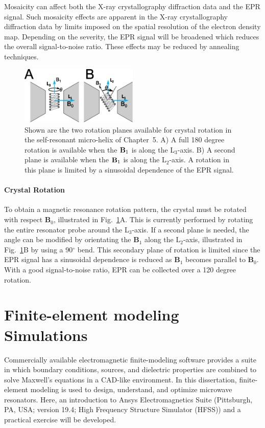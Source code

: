 Mosaicity can affect both the X-ray crystallography diffraction data and the EPR signal. Such mosaicity effects are apparent in the X-ray crystallography diffraction data by limits imposed on the spatial resolution of the electron density map. \cite{blundell1976protein} Depending on the severity, the EPR signal will be broadened which reduces the overall signal-to-noise ratio. These effects may be reduced by annealing techniques. \cite{Kriminskien0056}

\begin{figure}[htb]
 \centering
 \includegraphics[width=0.5\textwidth]{Kapitel/Ch2-Images/RotateMeLeftRight.eps}
 \caption[Rotation Planes of micro-Helix.]{Shown are the two rotation planes available for crystal rotation in the self-resonant micro-helix of Chapter~5. A) A full 180 degree rotation is available when the ${\textbf B}_1$ is along the L$_3$-axis. B) A second plane is available when the ${\textbf B}_1$ is along the L$_2$-axis. A rotation in this plane is limited by a sinusoidal dependence of the EPR signal. }
 \label{fig:RotateMe}
\end{figure}

\paragraph*{Crystal Rotation} To obtain a magnetic resonance rotation pattern, the crystal must be rotated with respect $\mathbf{B}_0$, illustrated in Fig.~\ref{fig:RotateMe}A. This is currently performed by rotating the entire resonator probe around the L$_3$-axis. If a second plane is needed, the angle can be modified by orientating the $\mathbf{B}_1$ along the L$_2$-axis, illustrated in Fig.~\ref{fig:RotateMe}B by using a 90$^{\circ}$ bend. This secondary plane of rotation is limited since the EPR signal has a sinusoidal dependence is reduced as $\mathbf{B}_1$ becomes parallel to $\mathbf{B}_0$. With a good signal-to-noise ratio, EPR can be collected over a 120 degree rotation.

\section{Finite-element modeling Simulations}
Commercially available electromagnetic finite-modeling software provides a suite in which boundary conditions, sources, and dielectric properties are combined to solve Maxwell's equations in a CAD-like environment. In this dissertation, finite-element modeling is used to design, understand, and optimize microwave resonators. Here, an introduction to Ansys Electromagnetics Suite (Pittsburgh, PA, USA; version 19.4; High Frequency Structure Simulator (HFSS)) and a practical exercise will be developed. 


